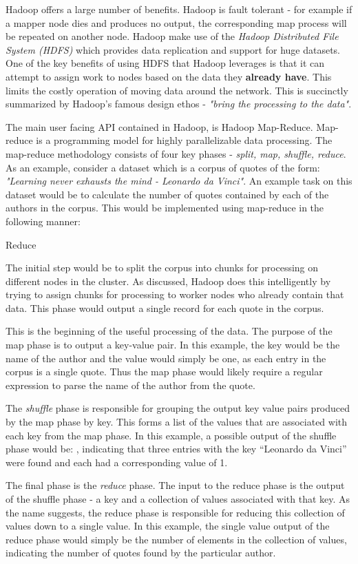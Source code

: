 Hadoop offers a large number of benefits. Hadoop is fault tolerant - for example if a mapper node dies and produces no output, the corresponding map process will be repeated on another node. Hadoop make use of the \textit{Hadoop Distributed File System (HDFS)} \cite{HDFS} which provides data replication and support for huge datasets. One of the key benefits of using HDFS that Hadoop leverages is that it can attempt to assign work to nodes based on the data they \textbf{already have}. This limits the costly operation of moving data around the network. This is succinctly summarized by Hadoop's famous design ethos - \textit{"bring the processing to the data"}.

The main user facing API contained in Hadoop, is Hadoop Map-Reduce. Map-reduce is a programming model for highly parallelizable data processing. The map-reduce methodology consists of four key phases - \textit{split, map, shuffle, reduce}. As an example, consider a dataset which is a corpus of quotes of the form:
\textit{"Learning never exhausts the mind - Leonardo da Vinci"}. An example task on this dataset would be to calculate the number of quotes contained by each of the authors in the corpus. This would be implemented using map-reduce in the following manner:

\begin{labeling}{Reduce }
	\item [Split] The initial step would be to split the corpus into chunks for processing on different nodes in the cluster. As discussed, Hadoop does this intelligently by trying to assign chunks for processing to worker nodes who already contain that data. This phase would output a single record for each quote in the corpus.
  \item [Map] This is the beginning of the useful processing of the data. The purpose of the map phase is to output a key-value pair. In this example, the key would be the name of the author and the value would simply be one, as each entry in the corpus is a single quote. Thus the map phase would likely require a regular expression to parse the name of the author from the quote.
  \item [Shuffle] The \textit{shuffle} phase is responsible for grouping the output key value pairs produced by the map phase by key. This forms a list of the values that are associated with each key from the map phase. In this example, a possible output of the shuffle phase would be: , indicating that three entries with the key ``Leonardo da Vinci'' were found and each had a corresponding value of 1. 
  \item [Reduce] The final phase is the \textit{reduce} phase. The input to the reduce phase is the output of the shuffle phase - a key and a collection of values associated with that key. As the name suggests, the reduce phase is responsible for reducing this collection of values down to a single value. In this example, the single value output of the reduce phase would simply be the number of elements in the collection of values, indicating the number of quotes found by the particular author.
\end{labeling}


